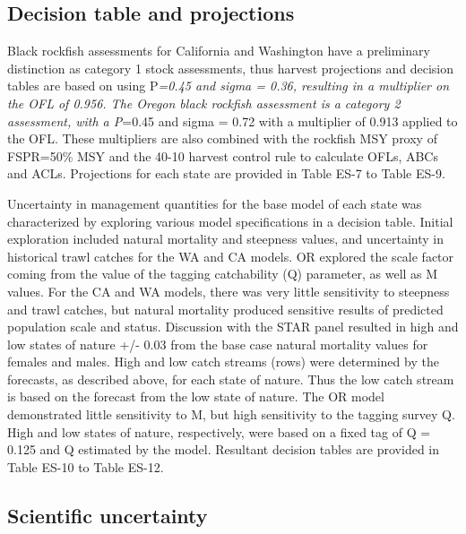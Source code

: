 \documentclass[11pt,
  english,
  letterpaper,
]{article}
\begin{document}
\hypertarget{decision-table-and-projections}{%
\subsection*{Decision table and projections}\label{decision-table-and-projections}}

Black rockfish assessments for California and Washington have a preliminary distinction as category 1 stock assessments, thus harvest projections and decision tables are based on using P\emph{=0.45 and sigma = 0.36, resulting in a multiplier on the OFL of 0.956. The Oregon black rockfish assessment is a category 2 assessment, with a P}=0.45 and sigma = 0.72 with a multiplier of 0.913 applied to the OFL. These multipliers are also combined with the rockfish MSY proxy of FSPR=50\% MSY and the 40-10 harvest control rule to calculate OFLs, ABCs and ACLs. Projections for each state are provided in Table ES-7 to Table ES-9.

Uncertainty in management quantities for the base model of each state was characterized by exploring various model specifications in a decision table. Initial exploration included natural mortality and steepness values, and uncertainty in historical trawl catches for the WA and CA models. OR explored the scale factor coming from the value of the tagging catchability (Q) parameter, as well as M values. For the CA and WA models, there was very little sensitivity to steepness and trawl catches, but natural mortality produced sensitive results of predicted population scale and status. Discussion with the STAR panel resulted in high and low states of nature +/- 0.03 from the base case natural mortality values for females and males. High and low catch streams (rows) were determined by the forecasts, as described above, for each state of nature. Thus the low catch stream is based on the forecast from the low state of nature. The OR model demonstrated little sensitivity to M, but high sensitivity to the tagging survey Q. High and low states of nature, respectively, were based on a fixed tag of Q = 0.125 and Q estimated by the model. Resultant decision tables are provided in Table ES-10 to Table ES-12.

\hypertarget{scientific-uncertainty}{%
\subsection*{Scientific uncertainty}\label{scientific-uncertainty}}
\end{document}
